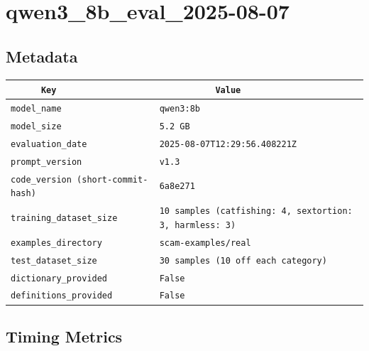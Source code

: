 \documentclass{article}
\begin{document}
\section{qwen3\_8b\_eval\_2025-08-07}
\subsection{Metadata}

\begin{center}
\begin{tabular}{l | l} \hline
    \verb|      Key      | & \verb|           Value           | \\ \hline
    \hline
    \verb|model_name    | & \verb|qwen3:8b                     | \\ \hline
    \verb|model_size    | & \verb|5.2 GB                       | \\ \hline
    \verb|evaluation_date| & \verb|2025-08-07T12:29:56.408221Z  | \\ \hline
    \verb|prompt_version| & \verb|v1.3                         | \\ \hline
    \verb|code_version (short-commit-hash)| & \verb|6a8e271                      | \\ \hline
    \verb|training_dataset_size| & \verb|10 samples (catfishing: 4, sextortion: 3, harmless: 3)| \\ \hline
    \verb|examples_directory| & \verb|scam-examples/real           | \\ \hline
    \verb|test_dataset_size| & \verb|30 samples (10 off each category)| \\ \hline
    \verb|dictionary_provided| & \verb|False                        | \\ \hline
    \verb|definitions_provided| & \verb|False                        | \\ \hline
\end{tabular}
\end{center}

\subsection{Timing Metrics}
\end{document}
